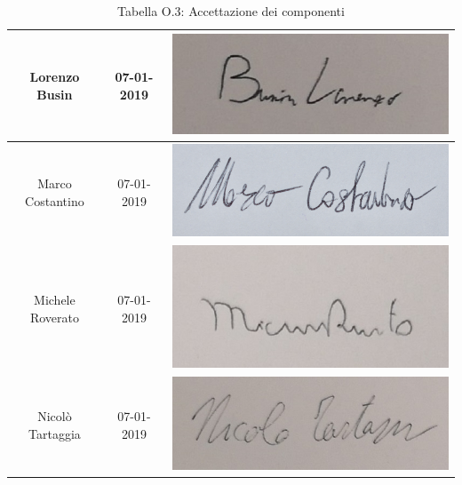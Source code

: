 \begin{table}[H]
\begin{center}
\begin{tabular}{| c | c | c |}
    Lorenzo Busin & 07-01-2019 & \includegraphics[align=c,scale=0.25]{Res/Firme/lorenzo.jpg} \\ \hline
    Marco Costantino & 07-01-2019 & \includegraphics[align=c,scale=0.35]{Res/Firme/marco.png} \\ \hline
    Michele Roverato & 07-01-2019 & \includegraphics[align=c,scale=0.25]{Res/Firme/michele.jpg} \\ \hline
    Nicolò Tartaggia & 07-01-2019 & \includegraphics[align=c,scale=0.25]{Res/Firme/tartizz.jpg} \\ 
    \hline
  \end{tabular}
  \caption{Tabella O.3: Accettazione dei componenti\label{}}
\end{center}
\end{table}
\renewcommand{\arraystretch}{1}

